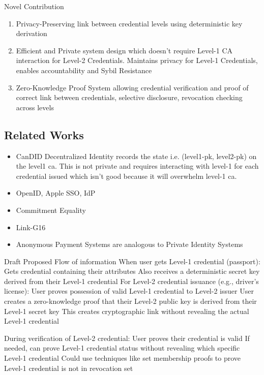 Novel Contribution
\begin{enumerate}
    \item Privacy-Preserving link between credential levels using deterministic key derivation
    \item Efficient and Private system design which doesn't require Level-1 CA interaction for Level-2 Credentials. Maintains privacy for Level-1 Credentials, enables accountability and Sybil Resistance
    \item Zero-Knowledge Proof System allowing credential verification and proof of correct link between credentials, selective disclosure, revocation checking across levels
\end{enumerate}


\subsection{Related Works}
\begin{itemize}
    \item CanDID Decentralized Identity records the state i.e. (level1-pk, level2-pk) on the level1 ca. This is not private and requires interacting with level-1 for each credential issued which isn't good because it will overwhelm level-1 ca.

    \item OpenID, Apple SSO, IdP

    \item Commitment Equality

    \item Link-G16

    \item Anonymous Payment Systems are analogous to Private Identity Systems
    
\end{itemize}



Draft Proposed Flow of information
When user gets Level-1 credential (passport):
Gets credential containing their attributes
Also receives a deterministic secret key derived from their Level-1 credential
For Level-2 credential issuance (e.g., driver's license):
User proves possession of valid Level-1 credential to Level-2 issuer
User creates a zero-knowledge proof that their Level-2 public key is derived from their Level-1 secret key
This creates cryptographic link without revealing the actual Level-1 credential


During verification of Level-2 credential:
User proves their credential is valid
If needed, can prove Level-1 credential status without revealing which specific Level-1 credential
Could use techniques like set membership proofs to prove Level-1 credential is not in revocation set

